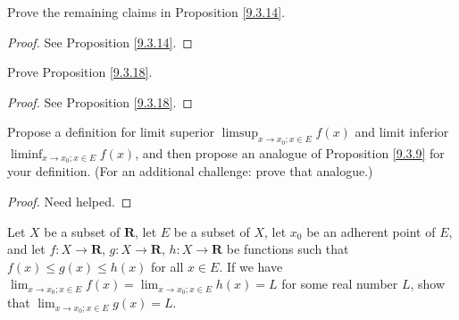 \begin{exercise}\label{ex 9.3.2}
    Prove the remaining claims in Proposition \ref{9.3.14}.
\end{exercise}

\begin{proof}
    See Proposition \ref{9.3.14}.
\end{proof}

\begin{exercise}\label{ex 9.3.3}
    Prove Proposition \ref{9.3.18}.
\end{exercise}

\begin{proof}
    See Proposition \ref{9.3.18}.
\end{proof}

\begin{exercise}\label{ex 9.3.4}
    Propose a definition for limit superior \(\limsup_{x \to x_0 ; x \in E} f(x)\) and limit inferior \(\liminf_{x \to x_0 ; x \in E} f(x)\), and then propose an analogue of Proposition \ref{9.3.9} for your definition.
    (For an additional challenge: prove that analogue.)
\end{exercise}

\begin{proof}
    Need helped.
\end{proof}

\begin{exercise}\label{ex 9.3.5}
    Let \(X\) be a subset of \(\mathbf{R}\), let \(E\) be a subset of \(X\), let \(x_0\) be an adherent point of \(E\), and let \(f : X \to \mathbf{R}\), \(g : X \to \mathbf{R}\), \(h : X \to \mathbf{R}\) be functions such that \(f(x) \leq g(x) \leq h(x)\) for all \(x \in E\).
    If we have \(\lim_{x \to x_0 ; x \in E} f(x) = \lim_{x \to x_0 ; x \in E} h(x) = L\) for some real number \(L\), show that \(\lim_{x \to x_0 ; x \in E} g(x) = L\).
\end{exercise}